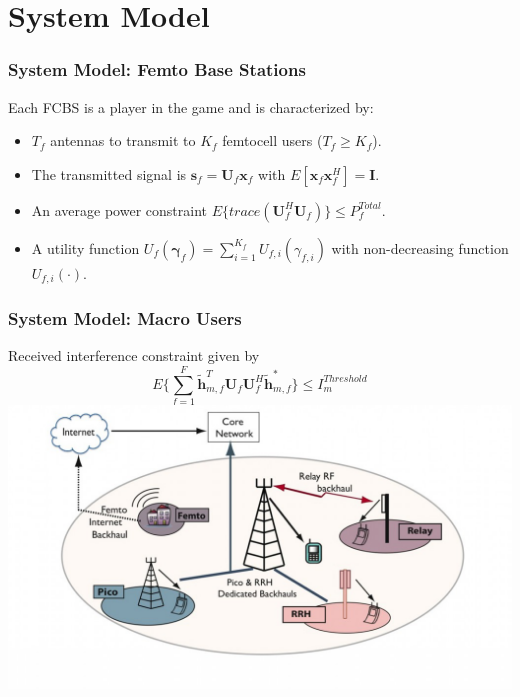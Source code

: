 \documentclass[10pt,tgadventor, onlymath]{beamer}
\begin{document}
\section{System Model}
\begin{frame}
\frametitle{System Model: Femto Base Stations}
Each FCBS is a player in the game and is characterized by:
\\
\begin{itemize}
\setlength\itemsep{2em}

\item 
	$T_{f}$ antennas to transmit to $K_{f}$ femtocell users ($T_{f} \geq K_{f}$).
\item 
	The transmitted 		
	signal is $\mathbf{s}_{f
	}= \mathbf{U}_{f}\mathbf{x}_{f}$ with $E[\mathbf{x}_{f}\mathbf{x}_{f}^H] = \mathbf{I}$.
\item 
	An average power constraint $E\{trace(\mathbf{U}_{f}^H\mathbf{U}_{f})\} \leq P^{Total}_{f} $.
\item 
	A utility function $U_{f}(\boldsymbol{\gamma}_{f}) =
	\sum_{i=1}^{K_{f}}
    	 U_{f,i}(\gamma_{f,i}) $
    	with non-decreasing function $U_{f,i}(\cdot)$.
\end{itemize}
\end{frame}


\begin{frame}
\frametitle{System Model: Macro Users}
	Received interference constraint given by 
	\begin{equation}
	E\{\sum^F_{f=1} \mathbf{\tilde{h}}_{m,f}^T  \mathbf{U}_{f}					
	\mathbf{U}_{f}^{H} \mathbf{\tilde{h}}_{m,f}^*\} \leq I^{Threshold}		
	_{m}
	\end{equation}
	\bigskip
	\centering
		\includegraphics[scale=.2]{het_net}
\end{frame}
\end{document}
